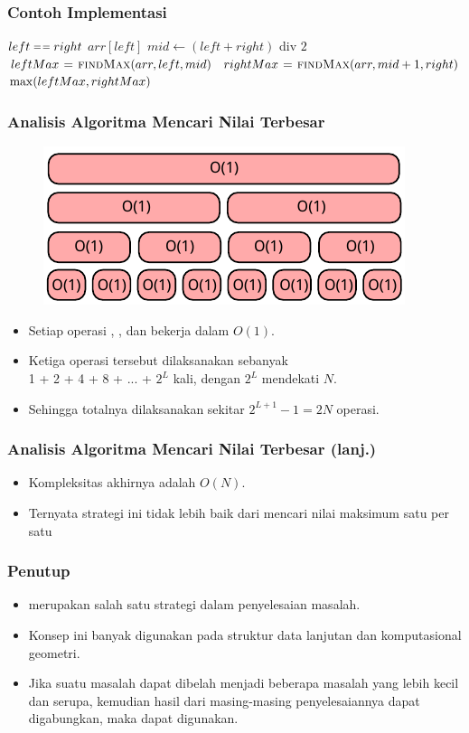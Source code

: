 \begin{frame}
\frametitle{Contoh Implementasi}
\begin{codebox}
\li \If $left \isequal right$ \Then
\li   \Return $arr[left]$
\li \Else 
\li   $mid \gets (left + right)$ div $2$
\li   $leftMax \mathrel{\hspace{1pt}=\hspace{1pt}} \textnormal{\scshape findMax}(arr, left, mid)$
\li   $rightMax \mathrel{\hspace{1pt}=\hspace{1pt}} \textnormal{\scshape findMax}(arr, mid+1, right)$
\li   \Return $\func{max}(leftMax, rightMax)$
    \End
\end{codebox}
\end{frame}

\begin{frame}
\frametitle{Analisis Algoritma Mencari Nilai Terbesar}
\begin{figure}
  \centering
  \includegraphics[width=8 cm]{asset/find-max-complexity.pdf}
\end{figure}
\begin{itemize}
  \item Setiap operasi , , dan  bekerja dalam $O(1)$.
  \item Ketiga operasi tersebut dilaksanakan sebanyak\\1 + 2 + 4 + 8 + ... + $2^L$ kali, dengan $2^L$ mendekati $N$.
  \item Sehingga totalnya dilaksanakan sekitar $2^{L+1} - 1 = 2N$ operasi.
\end{itemize}
\end{frame}

\begin{frame}
\frametitle{Analisis Algoritma Mencari Nilai Terbesar (lanj.)}
\begin{itemize}
  \item Kompleksitas akhirnya adalah $O(N)$.
  \item Ternyata strategi ini tidak lebih baik dari mencari nilai maksimum satu per satu
\end{itemize}
\end{frame}

\begin{frame}
\frametitle{Penutup}
\begin{itemize}
  \item {} merupakan salah satu strategi dalam penyelesaian masalah.
  \item Konsep ini banyak digunakan pada struktur data lanjutan dan komputasional geometri.
  \item Jika suatu masalah dapat dibelah menjadi beberapa masalah yang lebih kecil dan serupa, kemudian hasil dari masing-masing penyelesaiannya dapat digabungkan, maka  dapat digunakan.
\end{itemize}
\end{frame}


